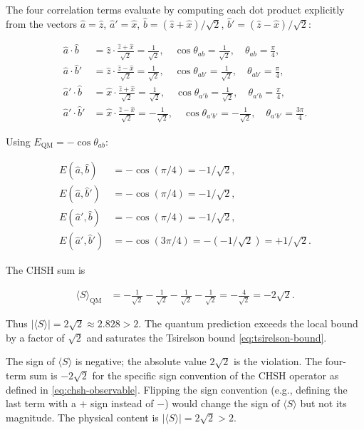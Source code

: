 The four correlation terms evaluate by computing each dot product explicitly from the vectors $\hat{a} = \hat{z}$, $\hat{a}' = \hat{x}$, $\hat{b} = (\hat{z} + \hat{x})/\sqrt{2}$, $\hat{b}' = (\hat{z} - \hat{x})/\sqrt{2}$:
\begin{linenomath}
\begin{align}
\hat{a}\cdot\hat{b} &= \hat{z}\cdot\frac{\hat{z}+\hat{x}}{\sqrt{2}} = \frac{1}{\sqrt{2}},
\quad \cos\theta_{ab} = \frac{1}{\sqrt{2}},\quad \theta_{ab} = \frac{\pi}{4}, \\
\hat{a}\cdot\hat{b}' &= \hat{z}\cdot\frac{\hat{z}-\hat{x}}{\sqrt{2}} = \frac{1}{\sqrt{2}},
\quad \cos\theta_{ab'} = \frac{1}{\sqrt{2}},\quad \theta_{ab'} = \frac{\pi}{4}, \\
\hat{a}'\cdot\hat{b} &= \hat{x}\cdot\frac{\hat{z}+\hat{x}}{\sqrt{2}} = \frac{1}{\sqrt{2}},
\quad \cos\theta_{a'b} = \frac{1}{\sqrt{2}},\quad \theta_{a'b} = \frac{\pi}{4}, \\
\hat{a}'\cdot\hat{b}' &= \hat{x}\cdot\frac{\hat{z}-\hat{x}}{\sqrt{2}} = -\frac{1}{\sqrt{2}},
\quad \cos\theta_{a'b'} = -\frac{1}{\sqrt{2}},\quad \theta_{a'b'} = \frac{3\pi}{4}.
\end{align}
\end{linenomath}
Using $E_{\text{QM}} = -\cos\theta_{ab}$:
\begin{linenomath}
\begin{align}
E(\hat{a},\hat{b}) &= -\cos(\pi/4) = -1/\sqrt{2}, \\
E(\hat{a},\hat{b}') &= -\cos(\pi/4) = -1/\sqrt{2}, \\
E(\hat{a}',\hat{b}) &= -\cos(\pi/4) = -1/\sqrt{2}, \\
E(\hat{a}',\hat{b}') &= -\cos(3\pi/4) = -(-1/\sqrt{2}) = +1/\sqrt{2}.
\end{align}
\end{linenomath}
The CHSH sum is
\begin{linenomath}
\begin{align}
\langle S\rangle_{\text{QM}}
&= -\frac{1}{\sqrt{2}} - \frac{1}{\sqrt{2}} - \frac{1}{\sqrt{2}} - \frac{1}{\sqrt{2}}
= -\frac{4}{\sqrt{2}} = -2\sqrt{2}.
\end{align}
\end{linenomath}
Thus $\lvert\langle S\rangle\rvert = 2\sqrt{2} \approx 2.828 > 2$. The quantum prediction exceeds the local bound by a factor of $\sqrt{2}$ and saturates the Tsirelson bound \eqref{eq:tsirelson-bound}.

\begin{note}
The sign of $\langle S\rangle$ is negative; the absolute value $2\sqrt{2}$ is the violation. The four-term sum is $-2\sqrt{2}$ for the specific sign convention of the CHSH operator as defined in \eqref{eq:chsh-observable}. Flipping the sign convention (e.g., defining the last term with a $+$ sign instead of $-$) would change the sign of $\langle S\rangle$ but not its magnitude. The physical content is $\lvert\langle S\rangle\rvert = 2\sqrt{2} > 2$.
\end{note}

